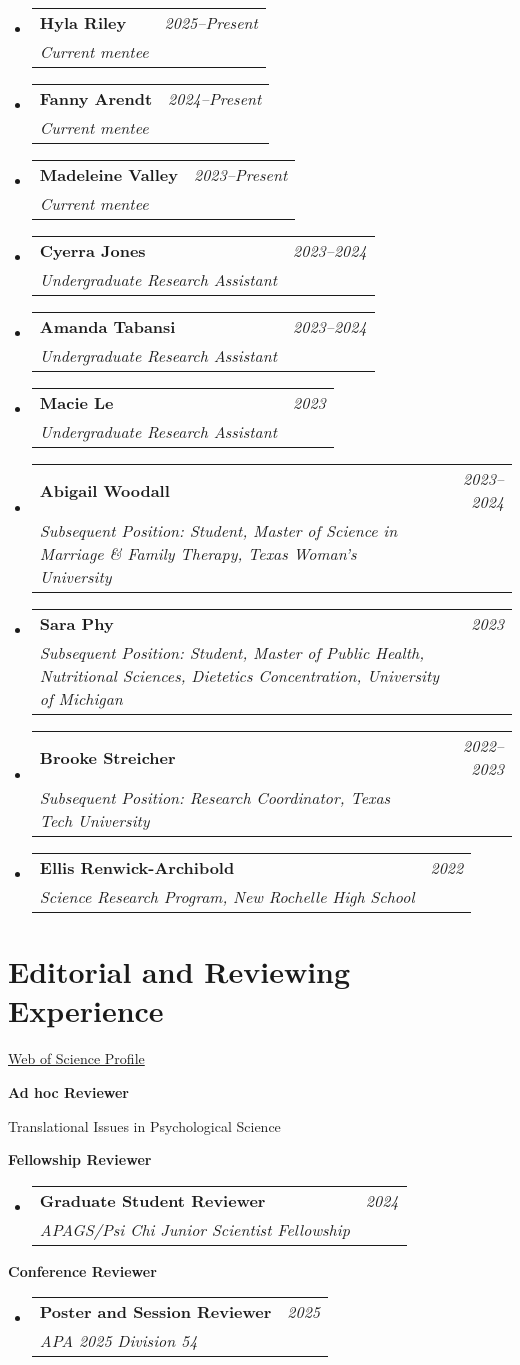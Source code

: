 \documentclass[letter,11pt]{article}
\makeatletter
\newcommand{\resumeSubheading}[4]{
\vspace{0.5mm}\item
    \begin{tabular*}{0.98\textwidth}[t]{l@{\extracolsep{\fill}}r}
        \textbf{#1} & \textit{\footnotesize{#4}} \\
        \textit{\footnotesize{#3}} &  \footnotesize{#2}\\
    \end{tabular*}
    \vspace{-2.4mm}
}
\newcommand{\resumeSubHeadingListStart}{\begin{itemize}[leftmargin=*,labelsep=1mm]}
\newcommand{\resumeSubHeadingListEnd}{\end{itemize}\vspace{2mm}}
\makeatother
\begin{document}
  \resumeSubHeadingListStart
    \resumeSubheading
      {Hyla Riley}{}
      {Current mentee}{2025–Present}
    \resumeSubheading
      {Fanny Arendt}{}
      {Current mentee}{2024–Present}
    \resumeSubheading
      {Madeleine Valley}{}
      {Current mentee}{2023–Present}
    \resumeSubheading
      {Cyerra Jones}{}
      {Undergraduate Research Assistant}{2023–2024}
    \resumeSubheading
      {Amanda Tabansi}{}
      {Undergraduate Research Assistant}{2023–2024}
    \resumeSubheading
      {Macie Le}{}
      {Undergraduate Research Assistant}{2023}
    \resumeSubheading
      {Abigail Woodall}{}
      {Subsequent Position: Student, Master of Science in Marriage \& Family Therapy, Texas Woman’s University}{2023–2024}
    \resumeSubheading
      {Sara Phy}{}
      {Subsequent Position: Student, Master of Public Health, Nutritional Sciences, Dietetics Concentration, University of Michigan}{2023}
    \resumeSubheading
      {Brooke Streicher}{}
      {Subsequent Position: Research Coordinator, Texas Tech University}{2022–2023}
    \resumeSubheading
      {Ellis Renwick-Archibold}{}
      {Science Research Program, New Rochelle High School}{2022}
    \resumeSubHeadingListEnd
\vspace{-6mm}

\section{\textbf{Editorial and Reviewing Experience}}

\vspace{-0.4mm}
\href{https://www.webofscience.com/wos/author/record/ABE-9213-2021}{\scriptsize Web of Science Profile}
\vspace{1mm}

\textbf{Ad hoc Reviewer}
\vspace{0.2mm}

Translational Issues in Psychological Science

\vspace{3mm}

\textbf{Fellowship Reviewer}
\vspace{-4mm}

  \resumeSubHeadingListStart
    \resumeSubheading
      {Graduate Student Reviewer}{}
      {APAGS/Psi Chi Junior Scientist Fellowship}{2024}
    \resumeSubHeadingListEnd


\textbf{Conference Reviewer}
\vspace{-4mm}

  \resumeSubHeadingListStart
    \resumeSubheading
      {Poster and Session Reviewer}{}
      {APA 2025 Division 54}{2025}
    \resumeSubHeadingListEnd
\end{document}

